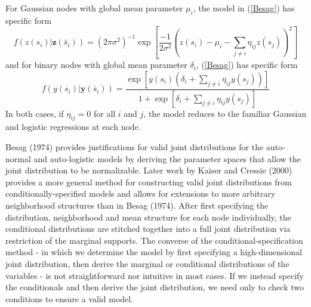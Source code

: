 \documentclass[12pt, a4paper, twoside]{article}
\begin{document}
For Gaussian nodes with global mean parameter $\mu_i$, the model in (\ref{Besag}) has specific form
\begin{equation*}\label{BesagZ}
f(z(s_i) | \boldsymbol{z}(\bar{s}_i)) = (2\pi\sigma^2)^{-1}\exp\left\lbrack \frac{-1}{2\sigma^2}\left(z(s_i) - \mu_i - \sum_{j\neq i}^{}\eta_{ij}z(s_j) \right)^2\right\rbrack
\end{equation*}
and for binary nodes with global mean parameter $\delta_i$, (\ref{Besag}) has specific form
\begin{equation*} \label{BesagY}
f(y(s_i) | \boldsymbol{y}(\bar{s}_i)) = \frac{\exp\left\lbrack y(s_i)(\delta_i + \sum_{j\neq i}^{}\eta_{ij}y(s_j))\right\rbrack}{1+\exp\left\lbrack\delta_i + \sum_{j\neq i}^{}\eta_{ij}y(s_j)\right\rbrack}
\end{equation*}
In both cases, if $\eta_{ij} = 0$ for all $i$ and $j$, the model reduces to the familiar Gaussian and logistic regressions at each node. 

Besag (1974) provides justifications for valid joint distributions for the auto-normal and auto-logistic models by deriving the parameter spaces that allow the joint distribution to be normalizable. Later work by Kaiser and Cressie (2000) provides a more general method for constructing valid joint distributions from conditionally-specified models and allows for extensions to more arbitrary neighborhood structures than in Besag (1974). After first specifying the distribution, neighborhood and mean structure for each node individually, the conditional distributions are stitched together into a full joint distribution via restriction of the marginal supports. The converse of the conditional-specification method - in which we determine the model by first specifying a high-dimensional joint distribution, then derive the marginal or conditional distributions of the variables - is not straightforward nor intuitive in most cases. If we instead specify the conditionals and then derive the joint distribution, we need only to check two conditions to ensure a valid model.
\end{document}
